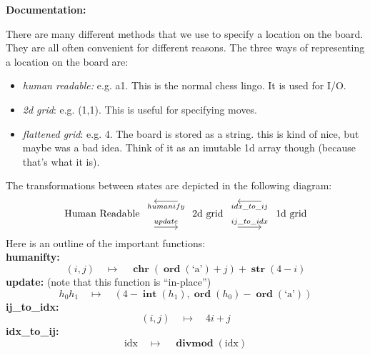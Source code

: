 \documentclass{article}[11pt]
\DeclareMathOperator{\ord}{\textbf{ord}}
\DeclareMathOperator{\chr}{\textbf{chr}}
\DeclareMathOperator{\str}{\textbf{str}}
\DeclareMathOperator{\into}{\textbf{int}}
\DeclareMathOperator{\divmod}{\textbf{divmod}}
\begin{document}
\begin{center}
	\textbf{Documentation:}
\end{center}

There are many different methods that we use to specify a location on the
board.  They are all often convenient for different reasons. The three ways of
representing a location on the board are:

\begin{itemize}
	\item \emph{human	readable:} e.g. a1. This is the normal chess lingo. It is used for I/O.
	\item \emph{2d grid}: e.g. (1,1). This is useful for specifying moves.
	\item \emph{flattened grid}: e.g. 4. The board is stored as a string. this is kind of
		nice, but maybe was a bad idea. Think of it as an imutable 1d array though
		(because that's what it is).
\end{itemize} 

\vspace{1cm}
The transformations between states are depicted in the following diagram:
\vspace{0.25cm}
$$
\begin{tikzcd}
	\text{Human Readable} \quad \arrow[r, yshift=-3ex, "update"] 
	&\quad \text{2d grid}\quad \arrow[l, yshift=3ex, "humanify"] \arrow[r, yshift=-3ex, "ij\_to\_idx"] 
	&\quad \text{1d grid} \arrow[l, yshift=3ex, "idx\_to\_ij"]
\end{tikzcd}
$$
\vspace{1cm}
$ $\\
Here is an outline of the important functions:\\
\textbf{humanifty:}
$$(i,j) \quad\mapsto\quad \chr(\ord(\text{`a'})+j) + \str(4-i)$$
\textbf{update:}
(note that this function is ``in-place'')
$$h_0h_1 \quad \mapsto \quad (4-\into(h_1), \ord(h_0) - \ord(\text{`a'}))$$
\textbf{ij\_to\_idx:}
$$(i,j) \quad \mapsto \quad 4i+j$$
\textbf{idx\_to\_ij:}
$$\text{idx} \quad \mapsto \quad \divmod(\text{idx})$$
\end{document}
